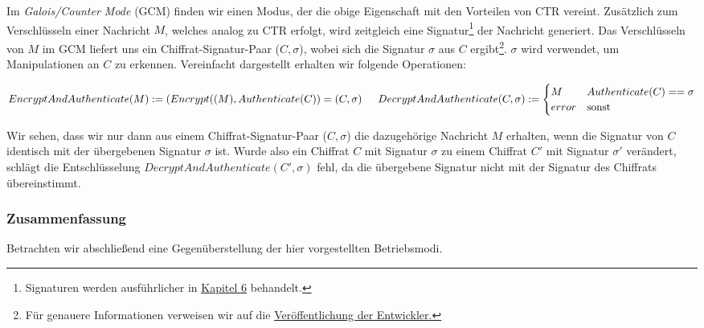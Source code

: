 Im \textit{Galois/Counter Mode} (GCM) finden wir einen Modus, der die obige Eigenschaft mit den Vorteilen von CTR vereint. Zusätzlich zum Verschlüsseln einer Nachricht \(M\), welches analog zu CTR erfolgt, wird zeitgleich eine Signatur\footnote{Signaturen werden ausführlicher in \hyperref[cha6]{Kapitel 6} behandelt.} der Nachricht generiert. Das Verschlüsseln von \(M\) im GCM liefert uns ein Chiffrat-Signatur-Paar (\(C, \sigma\)), wobei sich die Signatur \(\sigma\) aus \(C\) ergibt\footnote{Für genauere Informationen verweisen wir auf die \href{http://csrc.nist.gov/groups/ST/toolkit/BCM/documents/proposedmodes/gcm/gcm-spec.pdf}{Veröffentlichung der Entwickler.}}. \(\sigma\) wird verwendet, um Manipulationen an \(C\) zu erkennen.
Vereinfacht dargestellt erhalten wir folgende Operationen:
\bigskip

\begin{math}
	EncryptAndAuthenticate(M) := (Encrypt((M), Authenticate(C)) = (C, \sigma) \\
	\\
	\indent DecryptAndAuthenticate(C, \sigma) := \begin{cases}
		M           & Authenticate(C) == \sigma\\
		error       & \text{sonst}
	\end{cases}
\end{math}
\bigskip

Wir sehen, dass wir nur dann aus einem Chiffrat-Signatur-Paar (\(C, \sigma\)) die dazugehörige Nachricht \(M\) erhalten, wenn die Signatur von \(C\) identisch mit der übergebenen Signatur \(\sigma\) ist. Wurde also ein Chiffrat \(C\) mit Signatur \(\sigma\) zu einem Chiffrat \(C'\) mit Signatur \(\sigma'\) verändert, schlägt die Entschlüsselung \(DecryptAndAuthenticate(C', \sigma)\) fehl, da die übergebene Signatur nicht mit der Signatur des Chiffrats übereinstimmt.

\subsubsection{Zusammenfassung}
Betrachten wir abschließend eine Gegenüberstellung der hier vorgestellten Betriebsmodi.
\newpage

\captionsetup[table]{labelformat=empty}
\captionsetup[table]{singlelinecheck=false}
\captionsetup{font=footnotesize}

